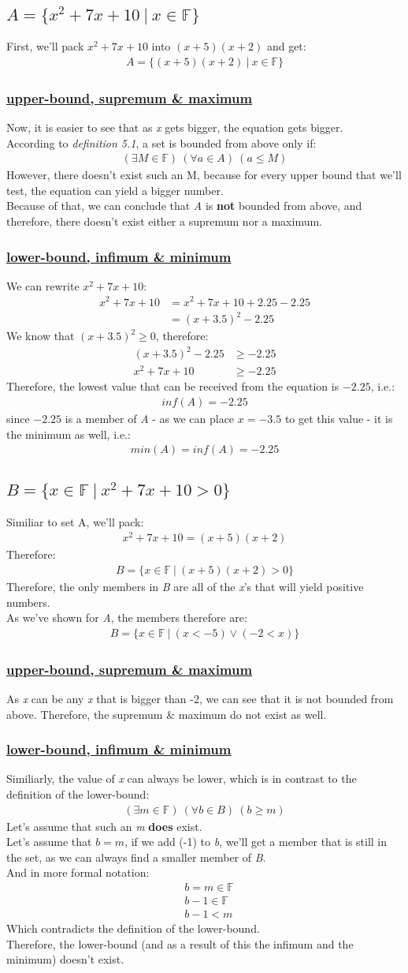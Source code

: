 \documentclass[a4paper, 12pt]{article}
\newcommand{\sub}[1]{\subsection{\underline{#1}}}
\newcommand{\subsub}[1]{\subsubsection{\underline{#1}}}
\newcommand{\F}{\ensuremath{\mathbb{F}}}
\newcommand{\eq}[1]{\begin{align*}#1\end{align*}}
\begin{document}
\section{}
\sub{$A=\{x^2+7x+10~|~x\in\F\}$}
First, we'll pack $x^2+7x+10$ into $(x+5)(x+2)$ and get: \eq{A=\{(x+5)(x+2)~|~x\in\F\}}
\subsub{upper-bound, supremum \& maximum}
Now, it is easier to see that as \textit{x} gets bigger, the equation gets bigger.\\
According to \textit{definition 5.1}, a set is bounded from above only if: \eq{(\exists{M}\in\F)~(\forall{a}\in{A})~(a\leq{M})}
However, there doesn't exist such an M, because for every upper bound that we'll test, the equation can yield a bigger number.\\
Because of that, we can conclude that \textit{A} is \textbf{not} bounded from above, and therefore, there doesn't exist either a supremum nor a maximum.
\subsub{lower-bound, infimum \& minimum}
We can rewrite $x^2+7x+10$:
\eq{
    x^2+7x+10&=x^2+7x+10+2.25-2.25\\
    &=(x+3.5)^2-2.25
}
We know that $(x+3.5)^2\geq{0}$, therefore:
\eq{
    (x+3.5)^2-2.25&\geq{-2.25}\\
    x^2+7x+10&\geq{-2.25}
}
Therefore, the lowest value that can be received from the equation is $-2.25$, i.e.: \eq{inf(A)=-2.25}
since $-2.25$ is a member of \textit{A} - as we can place $x=-3.5$ to get this value - it is the minimum as well, i.e.:
\eq{min(A)=inf(A)=-2.25}
\pagebreak
\sub{$B=\{x\in\F~|~x^2+7x+10>0\}$}
Similiar to set A, we'll pack:
\eq{x^2+7x+10=(x+5)(x+2)}
Therefore: \eq{B=\{x\in\F~|~(x+5)(x+2)>0\}}
Therefore, the only members in \textit{B} are all of the \textit{x}'s that will yield positive numbers.\\
As we've shown for \textit{A}, the members therefore are: \eq{B=\{x\in\F~|~(x<-5)\lor(-2<x)\}}
\subsub{upper-bound, supremum \& maximum}
As \textit{x} can be any \textit{x} that is bigger than -2, we can see that it is not bounded from above.
Therefore, the supremum \& maximum do not exist as well.
\subsub{lower-bound, infimum \& minimum}
Similiarly, the value of \textit{x} can always be lower, which is in contrast to the definition of the lower-bound:
\eq{(\exists{m}\in\F)~(\forall{b}\in{B})~(b\geq{m})}
Let's assume that such an \textit{m} \textbf{does} exist.\\
Let's assume that $b=m$, if we add (-1) to \textit{b}, we'll get a member that is still in the set,
as we can always find a smaller member of \textit{B}.\\
And in more formal notation:
\eq{
    &b=m\in\F\\
    &b-1\in\F\\
    &b-1<m
}
Which contradicts the definition of the lower-bound.\\
Therefore, the lower-bound (and as a result of this the infimum and the minimum) doesn't exist.
\pagebreak
\end{document}
